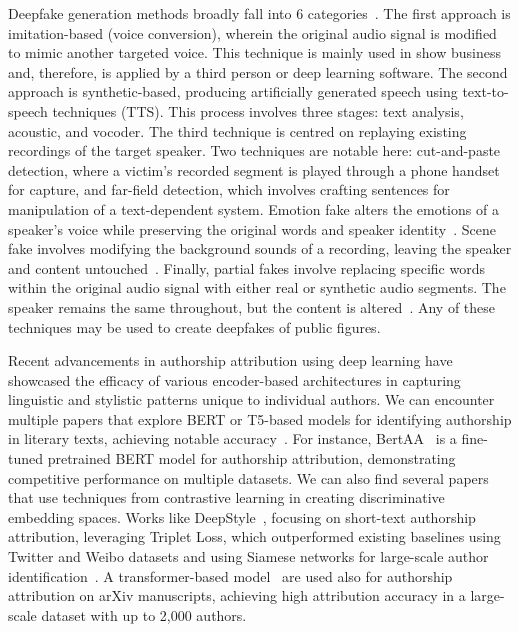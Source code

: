 \documentclass{Interspeech}
\begin{document}

Deepfake generation methods broadly fall into 6
categories~\cite{review_audio_deepfake_issues}. The first approach is
imitation-based (voice conversion), wherein the original audio signal is
modified to mimic another targeted voice. This technique is mainly used in show
business and, therefore, is applied by a third person or deep learning
software. The second approach is synthetic-based, producing artificially
generated speech using text-to-speech techniques (TTS). This process involves
three stages: text analysis, acoustic, and vocoder. The third technique is
centred on replaying existing recordings of the target speaker. Two techniques
are notable here: cut-and-paste detection, where a victim's recorded segment is
played through a phone handset for capture, and far-field detection, which
involves crafting sentences for manipulation of a text-dependent system.
Emotion fake alters the emotions of a speaker's voice while preserving the
original words and speaker identity~\cite{zhao2023emofake}. Scene fake involves
modifying the background sounds of a recording, leaving the speaker and content
untouched~\cite{yi2022scenefake}. Finally, partial fakes involve replacing
specific words within the original audio signal with either real or synthetic
audio segments. The speaker remains the same throughout, but the content is
altered~\cite{yi2023halftruth}. Any of these techniques may be used to create
deepfakes of public figures.

Recent advancements in authorship attribution using deep learning have
showcased the efficacy of various encoder-based architectures in capturing
linguistic and stylistic patterns unique to individual authors. We can
encounter multiple papers that explore BERT or T5-based models for identifying
authorship in literary texts, achieving notable
accuracy~\cite{hicke2023t5,silva2024forged}. For instance,
BertAA~\cite{fabien2020bertaa} is a fine-tuned pretrained BERT model for
authorship attribution, demonstrating competitive performance on multiple
datasets. We can also find several papers that use techniques from contrastive
learning in creating discriminative embedding spaces. Works like
DeepStyle~\cite{hu2020deepstyle}, focusing on short-text authorship
attribution, leveraging Triplet Loss, which outperformed existing baselines
using Twitter and Weibo datasets and using Siamese networks for large-scale
author identification~\cite{saedi2021siamese}. A transformer-based
model~\cite{bauersfeld2023cracking} are used also for authorship attribution on
arXiv manuscripts, achieving high attribution accuracy in a large-scale dataset
with up to 2,000 authors.
\end{document}
